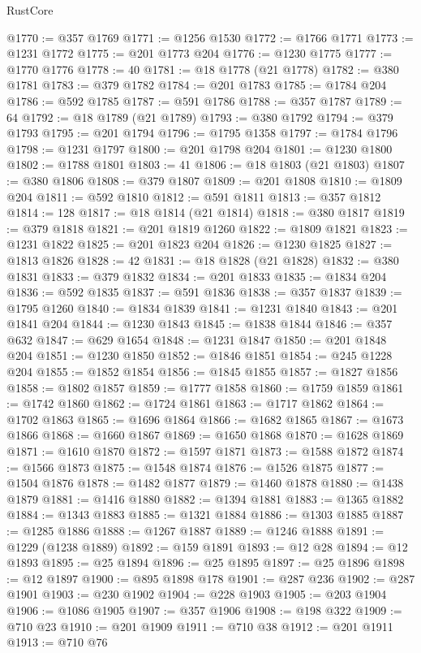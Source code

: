 \begin{lexlean}{RustCore}
\begin{coremodule}
@1770 := @357 @1769
@1771 := @1256 @1530
@1772 := @1766 @1771
@1773 := @1231 @1772
@1775 := @201 @1773 @204
@1776 := @1230 @1775
@1777 := @1770 @1776
@1778 := 40
@1781 := @18 @1778 (@21 @1778)
@1782 := @380 @1781
@1783 := @379 @1782
@1784 := @201 @1783
@1785 := @1784 @204
@1786 := @592 @1785
@1787 := @591 @1786
@1788 := @357 @1787
@1789 := 64
@1792 := @18 @1789 (@21 @1789)
@1793 := @380 @1792
@1794 := @379 @1793
@1795 := @201 @1794
@1796 := @1795 @1358
@1797 := @1784 @1796
@1798 := @1231 @1797
@1800 := @201 @1798 @204
@1801 := @1230 @1800
@1802 := @1788 @1801
@1803 := 41
@1806 := @18 @1803 (@21 @1803)
@1807 := @380 @1806
@1808 := @379 @1807
@1809 := @201 @1808
@1810 := @1809 @204
@1811 := @592 @1810
@1812 := @591 @1811
@1813 := @357 @1812
@1814 := 128
@1817 := @18 @1814 (@21 @1814)
@1818 := @380 @1817
@1819 := @379 @1818
@1821 := @201 @1819 @1260
@1822 := @1809 @1821
@1823 := @1231 @1822
@1825 := @201 @1823 @204
@1826 := @1230 @1825
@1827 := @1813 @1826
@1828 := 42
@1831 := @18 @1828 (@21 @1828)
@1832 := @380 @1831
@1833 := @379 @1832
@1834 := @201 @1833
@1835 := @1834 @204
@1836 := @592 @1835
@1837 := @591 @1836
@1838 := @357 @1837
@1839 := @1795 @1260
@1840 := @1834 @1839
@1841 := @1231 @1840
@1843 := @201 @1841 @204
@1844 := @1230 @1843
@1845 := @1838 @1844
@1846 := @357 @632
@1847 := @629 @1654
@1848 := @1231 @1847
@1850 := @201 @1848 @204
@1851 := @1230 @1850
@1852 := @1846 @1851
@1854 := @245 @1228 @204
@1855 := @1852 @1854
@1856 := @1845 @1855
@1857 := @1827 @1856
@1858 := @1802 @1857
@1859 := @1777 @1858
@1860 := @1759 @1859
@1861 := @1742 @1860
@1862 := @1724 @1861
@1863 := @1717 @1862
@1864 := @1702 @1863
@1865 := @1696 @1864
@1866 := @1682 @1865
@1867 := @1673 @1866
@1868 := @1660 @1867
@1869 := @1650 @1868
@1870 := @1628 @1869
@1871 := @1610 @1870
@1872 := @1597 @1871
@1873 := @1588 @1872
@1874 := @1566 @1873
@1875 := @1548 @1874
@1876 := @1526 @1875
@1877 := @1504 @1876
@1878 := @1482 @1877
@1879 := @1460 @1878
@1880 := @1438 @1879
@1881 := @1416 @1880
@1882 := @1394 @1881
@1883 := @1365 @1882
@1884 := @1343 @1883
@1885 := @1321 @1884
@1886 := @1303 @1885
@1887 := @1285 @1886
@1888 := @1267 @1887
@1889 := @1246 @1888
@1891 := @1229 (@1238 @1889)
@1892 := @159 @1891
@1893 := @12 @28
@1894 := @12 @1893
@1895 := @25 @1894
@1896 := @25 @1895
@1897 := @25 @1896
@1898 := @12 @1897
@1900 := @895 @1898 @178
@1901 := @287 @236
@1902 := @287 @1901
@1903 := @230 @1902
@1904 := @228 @1903
@1905 := @203 @1904
@1906 := @1086 @1905
@1907 := @357 @1906
@1908 := @198 @322
@1909 := @710 @23
@1910 := @201 @1909
@1911 := @710 @38
@1912 := @201 @1911
@1913 := @710 @76

\end{coremodule}
\end{lexlean}

